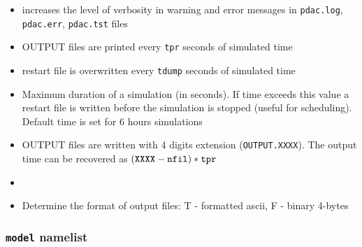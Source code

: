 \begin{itemize}
\item
{}
{increases the level of verbosity in warning and error messages 
in {\tt pdac.log}, {\tt pdac.err}, {\tt pdac.tst} files}

\item
{}
{OUTPUT files are printed every {\tt tpr} seconds of simulated time}

\item
{}
{restart file is overwritten every {\tt tdump} seconds of simulated time}

\item
{}
{Maximum duration of a simulation (in seconds). If time exceeds this value
a restart file is written before the simulation is stopped (useful for
scheduling). Default time is set for 6 hours simulations}

\item
{}
{OUTPUT files are written with 4 digits extension ({\tt OUTPUT.XXXX}). 
The output time can be recovered as $({\tt XXXX - nfil})* {\tt tpr}$ }

\item
{}
{}

\item
{}
{Determine the format of output files: T - formatted ascii, 
F - binary 4-bytes }

\end{itemize}

\subsubsection{{\tt model} namelist}

